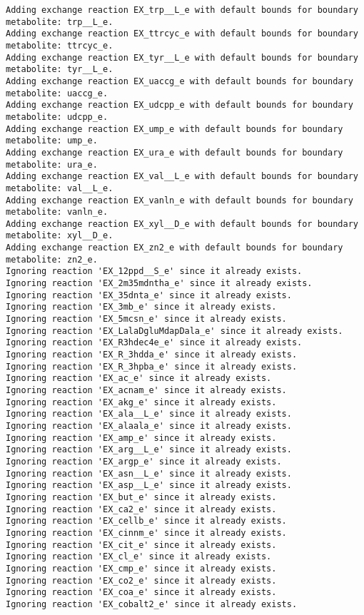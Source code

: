 \documentclass[
  letterpaper,
  DIV=11,
  numbers=noendperiod]{scrartcl}
\begin{document}
\begin{verbatim}
Adding exchange reaction EX_trp__L_e with default bounds for boundary metabolite: trp__L_e.
Adding exchange reaction EX_ttrcyc_e with default bounds for boundary metabolite: ttrcyc_e.
Adding exchange reaction EX_tyr__L_e with default bounds for boundary metabolite: tyr__L_e.
Adding exchange reaction EX_uaccg_e with default bounds for boundary metabolite: uaccg_e.
Adding exchange reaction EX_udcpp_e with default bounds for boundary metabolite: udcpp_e.
Adding exchange reaction EX_ump_e with default bounds for boundary metabolite: ump_e.
Adding exchange reaction EX_ura_e with default bounds for boundary metabolite: ura_e.
Adding exchange reaction EX_val__L_e with default bounds for boundary metabolite: val__L_e.
Adding exchange reaction EX_vanln_e with default bounds for boundary metabolite: vanln_e.
Adding exchange reaction EX_xyl__D_e with default bounds for boundary metabolite: xyl__D_e.
Adding exchange reaction EX_zn2_e with default bounds for boundary metabolite: zn2_e.
Ignoring reaction 'EX_12ppd__S_e' since it already exists.
Ignoring reaction 'EX_2m35mdntha_e' since it already exists.
Ignoring reaction 'EX_35dnta_e' since it already exists.
Ignoring reaction 'EX_3mb_e' since it already exists.
Ignoring reaction 'EX_5mcsn_e' since it already exists.
Ignoring reaction 'EX_LalaDgluMdapDala_e' since it already exists.
Ignoring reaction 'EX_R3hdec4e_e' since it already exists.
Ignoring reaction 'EX_R_3hdda_e' since it already exists.
Ignoring reaction 'EX_R_3hpba_e' since it already exists.
Ignoring reaction 'EX_ac_e' since it already exists.
Ignoring reaction 'EX_acnam_e' since it already exists.
Ignoring reaction 'EX_akg_e' since it already exists.
Ignoring reaction 'EX_ala__L_e' since it already exists.
Ignoring reaction 'EX_alaala_e' since it already exists.
Ignoring reaction 'EX_amp_e' since it already exists.
Ignoring reaction 'EX_arg__L_e' since it already exists.
Ignoring reaction 'EX_argp_e' since it already exists.
Ignoring reaction 'EX_asn__L_e' since it already exists.
Ignoring reaction 'EX_asp__L_e' since it already exists.
Ignoring reaction 'EX_but_e' since it already exists.
Ignoring reaction 'EX_ca2_e' since it already exists.
Ignoring reaction 'EX_cellb_e' since it already exists.
Ignoring reaction 'EX_cinnm_e' since it already exists.
Ignoring reaction 'EX_cit_e' since it already exists.
Ignoring reaction 'EX_cl_e' since it already exists.
Ignoring reaction 'EX_cmp_e' since it already exists.
Ignoring reaction 'EX_co2_e' since it already exists.
Ignoring reaction 'EX_coa_e' since it already exists.
Ignoring reaction 'EX_cobalt2_e' since it already exists.

\end{verbatim}
\end{document}
